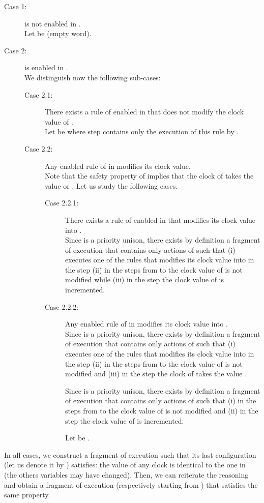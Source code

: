 \documentclass[11pt,english,letterpaper]{article}
\newenvironment{proof}{{\noindent\bf Proof. } }{{\hfill }}
\begin{document}
\begin{proof}
\begin{description}
\item[Case 1:]  is not enabled in .\\
Let  be  (empty word).
\item[Case 2:]  is enabled in .\\
We distinguish now the following sub-cases:
\begin{description}
\item[Case 2.1:] There exists a rule of  enabled in  that does not modify the clock value of .\\
Let  be  where step  contains only the execution of this rule by .
\item[Case 2.2:] Any enabled rule of  in  modifies its clock value.\\
Note that the safety property of  implies that the clock of  takes the value  or . Let us study the following cases.
\begin{description}
\item[Case 2.2.1:]  There exists a rule of  enabled in  that modifies its clock value into .\\
Since  is a priority unison, there exists by definition a fragment of execution   that contains only actions of  such that (i)  executes one of the rules that modifies its clock value into  in the step  (ii) in the steps from  to  the clock value of  is not modified while (iii) in the step	 the clock value of  is incremented.
\item[Case 2.2.2:]  Any enabled rule of  in  modifies its clock value into .\\
Since  is a priority unison, there exists by definition a fragment of execution  that contains only actions of  such that (i)  executes one of the rules that modifies its clock value into  in the step  (ii) in the steps from  to  the clock value of  is not modified and (iii) in the step	 the clock of  takes the value . 	
	
Since  is a priority unison, there exists by definition a fragment of execution  that contains only actions of  such that (i) in the steps from  to  the clock value of  is not modified and (ii) in the step	 the clock value of  is incremented.						

Let  be .
\end{description}
\end{description}
\end{description}

In all cases, we construct a fragment of execution  such that its last configuration (let us denote it by ) satisfies: the value of any clock is identical to the one in  (the others variables may have changed). Then, we can reiterate the reasoning and obtain a fragment of execution  (respectively starting from ) that satisfies the same property.


\end{proof}
\end{document}
